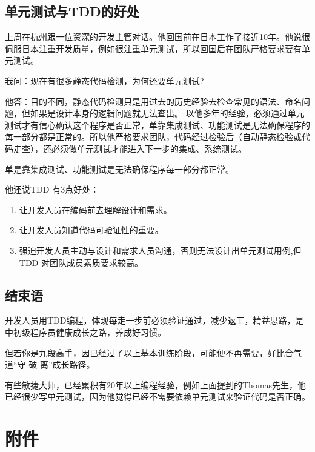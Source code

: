 \hypertarget{ux5355ux5143ux6d4bux8bd5ux4e0etddux7684ux597dux5904}{%
\subsection{单元测试与TDD的好处}\label{ux5355ux5143ux6d4bux8bd5ux4e0etddux7684ux597dux5904}}

上周在杭州跟一位资深的开发主管对话。他回国前在日本工作了接近10年。他说很佩服日本注重开发质量，例如很注重单元测试，所以回国后在团队严格要求要有单元测试。

我问：现在有很多静态代码检测，为何还要单元测试?

他答：目的不同，静态代码检测只是用过去的历史经验去检查常见的语法、命名问题，但如果是设计本身的逻辑问题就无法查出。
以他多年的经验，必须通过单元测试才有信心确认这个程序是否正常，单靠集成测试、功能测试是无法确保程序的每一部分都是正常的。所以他严格要求团队，代码经过检验后（自动静态检验或代码走查），还必须做单元测试才能进入下一步的集成、系统测试。

单是靠集成测试、功能测试是无法确保程序每一部分都正常。

他还说TDD 有3点好处：

\begin{enumerate}
\tightlist
\item
  让开发人员在编码前去理解设计和需求。
\item
  让开发人员知道代码可验证性的重要。
\item
  强迫开发人员主动与设计和需求人员沟通，否则无法设计出单元测试用例,但TDD
  对团队成员素质要求较高。
\end{enumerate}

\hypertarget{ux7ed3ux675fux8bed}{%
\subsection{结束语}\label{ux7ed3ux675fux8bed}}

开发人员用TDD编程，体现每走一步前必须验证通过，减少返工，精益思路，是中初级程序员健康成长之路，养成好习惯。

但若你是九段高手，因已经过了以上基本训练阶段，可能便不再需要，好比合气道``守
破 离''成长路径。

有些敏捷大师，已经累积有20年以上编程经验，例如上面提到的Thomas先生，他已经很少写单元测试，因为他觉得已经不需要依赖单元测试来验证代码是否正确。


\hypertarget{ux9644ux4ef6}{%
\section{附件}\label{ux9644ux4ef6}}

